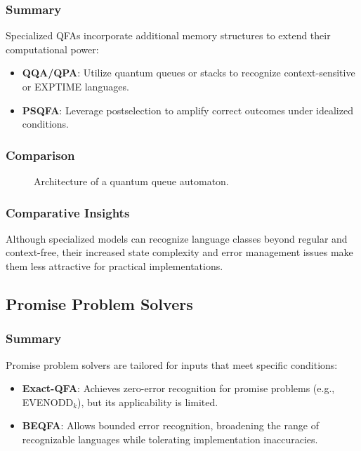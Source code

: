 \subsubsection{Summary}
Specialized QFAs incorporate additional memory structures to extend their computational power:
\begin{itemize}
    \item \textbf{QQA/QPA}: Utilize quantum queues or stacks to recognize context-sensitive or EXPTIME languages.
    \item \textbf{PSQFA}: Leverage postselection to amplify correct outcomes under idealized conditions.
\end{itemize}

\subsubsection{Comparison}
\begin{figure}[ht]
\centering
{}
\caption{Architecture of a quantum queue automaton.}
\label{fig:qqa}
\end{figure}

\subsubsection{Comparative Insights}
Although specialized models can recognize language classes beyond regular and context-free, their increased state complexity and error management issues make them less attractive for practical implementations.

\subsection*{Promise Problem Solvers}

\subsubsection{Summary}
Promise problem solvers are tailored for inputs that meet specific conditions:
\begin{itemize}
    \item \textbf{Exact-QFA}: Achieves zero-error recognition for promise problems (e.g., EVENODD$_k$), but its applicability is limited.
    \item \textbf{BEQFA}: Allows bounded error recognition, broadening the range of recognizable languages while tolerating implementation inaccuracies.
\end{itemize}

